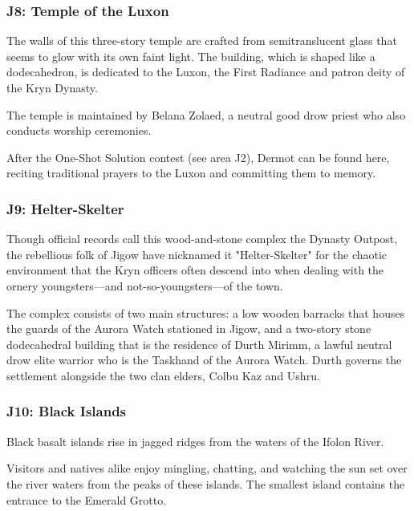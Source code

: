 \documentclass[10pt,a4paper,twoside,twocolumn,openany,nodeprecatedcode]{dndbook}
\begin{document}
\subsubsection{J8: Temple of the Luxon}
\begin{DndReadAloud}{}
The walls of this three-story temple are crafted from semitranslucent glass that seems to glow with its own faint light. The building, which is shaped like a dodecahedron, is dedicated to the Luxon, the First Radiance and patron deity of the Kryn Dynasty.

\end{DndReadAloud}

The temple is maintained by Belana Zolaed, a neutral good drow priest who also conducts worship ceremonies.

After the One-Shot Solution contest (see area J2), Dermot can be found here, reciting traditional prayers to the Luxon and committing them to memory.

\subsubsection{J9: Helter-Skelter}
Though official records call this wood-and-stone complex the Dynasty Outpost, the rebellious folk of Jigow have nicknamed it "Helter-Skelter" for the chaotic environment that the Kryn officers often descend into when dealing with the ornery youngsters—and not-so-youngsters—of the town.

The complex consists of two main structures: a low wooden barracks that houses the guards of the Aurora Watch stationed in Jigow, and a two-story stone dodecahedral building that is the residence of Durth Mirimm, a lawful neutral drow elite warrior who is the Taskhand of the Aurora Watch. Durth governs the settlement alongside the two clan elders, Colbu Kaz and Ushru.

\subsubsection{J10: Black Islands}
\begin{DndReadAloud}{}
Black basalt islands rise in jagged ridges from the waters of the Ifolon River.

\end{DndReadAloud}

Visitors and natives alike enjoy mingling, chatting, and watching the sun set over the river waters from the peaks of these islands. The smallest island contains the entrance to the Emerald Grotto.
\end{document}
